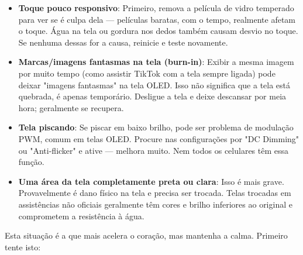 
\begin{itemize}
  \item \textbf{Toque pouco responsivo}: Primeiro, remova a película de vidro temperado para ver se é culpa dela — películas baratas, com o tempo, realmente afetam o toque. Água na tela ou gordura nos dedos também causam desvio no toque. Se nenhuma dessas for a causa, reinicie e teste novamente.
  \item \textbf{Marcas/imagens fantasmas na tela (burn-in)}: Exibir a mesma imagem por muito tempo (como assistir TikTok com a tela sempre ligada) pode deixar "imagens fantasmas" na tela OLED. Isso não significa que a tela está quebrada, é apenas temporário. Desligue a tela e deixe descansar por meia hora; geralmente se recupera.
  \item \textbf{Tela piscando}: Se piscar em baixo brilho, pode ser problema de modulação PWM, comum em telas OLED. Procure nas configurações por "DC Dimming" ou "Anti-flicker" e ative — melhora muito. Nem todos os celulares têm essa função.
  \item \textbf{Uma área da tela completamente preta ou clara}: Isso é mais grave. Provavelmente é dano físico na tela e precisa ser trocada. Telas trocadas em assistências não oficiais geralmente têm cores e brilho inferiores ao original e comprometem a resistência à água.
\end{itemize}


Esta situação é a que mais acelera o coração, mas mantenha a calma. Primeiro tente isto:

